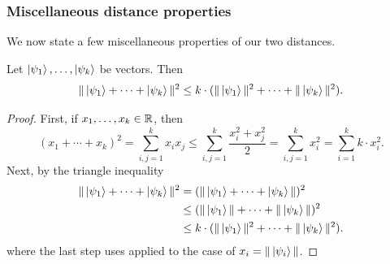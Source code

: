 \subsubsection{Miscellaneous distance properties}

We now state a few miscellaneous properties of our two distances.

\begin{proposition}\label{prop:triangle-inequality-for-vectors-squared}
Let $\ket{\psi_1}, \ldots, \ket{\psi_k}$ be vectors.
Then
\begin{equation*}
\Vert \ket{\psi_1} + \cdots + \ket{\psi_k} \Vert^2 \leq k \cdot(\Vert \ket{\psi_1}\Vert^2 + \cdots + \Vert \ket{\psi_k}\Vert^2).
\end{equation*}
\end{proposition}
\begin{proof}
First, if $x_1, \ldots, x_k \in \mathbb R$, then
\begin{equation}\label{eq:prop-for-real-numbers}
(x_1 + \cdots + x_k)^2 
= \sum_{i, j= 1}^k x_i x_j
\leq \sum_{i, j= 1}^k \frac{x_i^2 + x_j^2}{2}
= \sum_{i, j= 1}^k x_i^2
= \sum_{i=1}^k k \cdot x_i^2.
\end{equation}
Next, by the triangle inequality
\begin{align*}
\Vert \ket{\psi_1} + \cdots + \ket{\psi_k} \Vert^2
& = (\Vert \ket{\psi_1} + \cdots + \ket{\psi_k} \Vert)^2\\
& \leq (\Vert \ket{\psi_1}\Vert + \cdots + \Vert \ket{\psi_k} \Vert)^2\\
& \leq k \cdot(\Vert \ket{\psi_1}\Vert^2 + \cdots + \Vert \ket{\psi_k}\Vert^2).
\end{align*}
where the last step uses  applied to the case of $x_i = \Vert \ket{\psi_i}\Vert$.
\end{proof}

